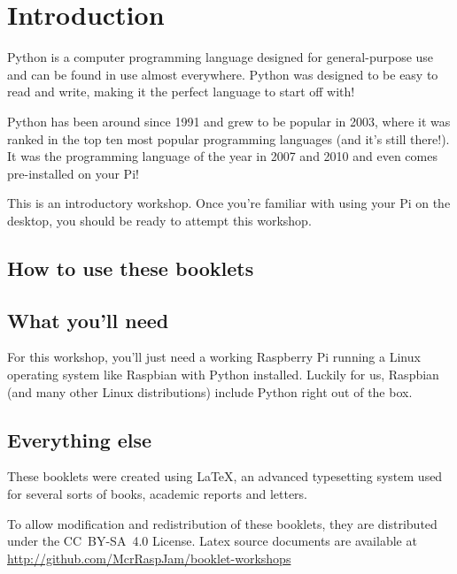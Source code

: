 \setcounter{section}{-1}
\section{Introduction}

	Python is a computer programming language designed for general-purpose use and can be found in use almost everywhere. Python was designed to be easy to read and write, making it the perfect language to start off with!

	Python has been around since 1991 and grew to be popular in 2003, where it was ranked in the top ten most popular programming languages (and it's still there!). It was the programming language of the year in 2007 and 2010 and even comes pre-installed on your Pi!

	This is an introductory workshop. Once you're familiar with using your Pi on the desktop, you should be ready to attempt this workshop.

	\subsection*{How to use these booklets}

		

		
		


	\subsection*{What you'll need}

		For this workshop, you'll just need a working Raspberry Pi running a Linux operating system like Raspbian with Python installed. Luckily for us, Raspbian (and many other Linux distributions) include Python right out of the box.

	\subsection*{Everything else}

		\ifprint\else These booklets were created using \textrm{\LaTeX}, an advanced typesetting system used for several sorts of books, academic reports and letters. \fi

		To allow modification and redistribution of these booklets, they are distributed under the \hbox{CC BY-SA 4.0} License.
		Latex source documents are available at \url{http://github.com/McrRaspJam/booklet-workshops}

